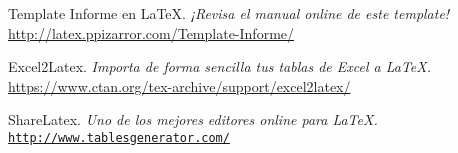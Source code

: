 \newpage %
\begin{references}
	Template Informe en \LaTeX.
	\textit{¡Revisa el manual online de este template!} \\
	\url{http://latex.ppizarror.com/Template-Informe/}
	
	Excel2Latex.
	\textit{Importa de forma sencilla tus tablas de Excel a \LaTeX.} \\
	\url{https://www.ctan.org/tex-archive/support/excel2latex/}
	
	ShareLatex.
	\textit{Uno de los mejores editores online para \LaTeX.} \\
	\href{https://www.sharelatex.com/?r=298b935f&rm=d&rs=b}{\texttt{http://www.tablesgenerator.com/}}
\end{references}
